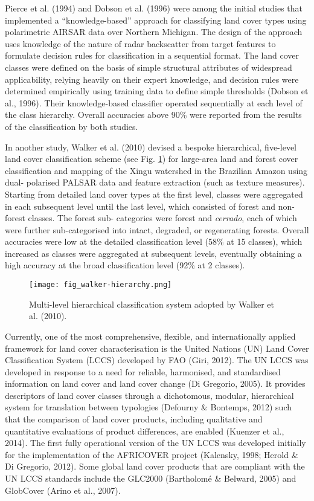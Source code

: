 Pierce et al. (1994) and Dobson et al. (1996) were among the initial studies that implemented a \enquote{knowledge-based} approach for classifying land cover types using polarimetric AIRSAR data over Northern Michigan. The design of the approach uses knowledge of the nature of radar backscatter from target features to formulate decision rules for classification in a sequential format. The land cover classes were defined on the basis of simple structural attributes of widespread applicability, relying heavily on their expert knowledge, and decision rules were determined empirically using training data to define simple thresholds (Dobson et al., 1996). Their knowledge-based classifier operated sequentially at each level of the class hierarchy. Overall accuracies above 90\% were reported from the results of the classification by both studies.

In another study, Walker et al. (2010) devised a bespoke hierarchical, five-level land cover classification scheme (see Fig. \ref{fig: litrev-fig2.1}) for large-area land and forest cover classification and mapping of the Xingu watershed in the Brazilian Amazon using dual- polarised PALSAR data and feature extraction (such as texture measures). Starting from detailed land cover types at the first level, classes were aggregated in each subsequent level until the last level, which consisted of forest and non-forest classes. The forest sub- categories were forest and \textit{cerrado}, each of which were further sub-categorised into intact, degraded, or regenerating forests. Overall accuracies were low at the detailed classification level (58\% at 15 classes), which increased as classes were aggregated at subsequent levels, eventually obtaining a high accuracy at the broad classification level (92\% at 2 classes).

\begin{figure}
	\centering
	\texttt{[image: fig\_walker-hierarchy.png]}
	\caption[Multi-level hierarchical classification system.]{Multi-level hierarchical classification system adopted by Walker et al. (2010).}
	\label{fig: litrev-fig2.1}
\end{figure}

Currently, one of the most comprehensive, flexible, and internationally applied framework for land cover characterisation is the United Nations (UN) Land Cover Classification System (LCCS) developed by FAO (Giri, 2012). The UN LCCS was developed in response to a need for reliable, harmonised, and standardised information on land cover and land cover change (Di Gregorio, 2005). It provides descriptors of land cover classes through a dichotomous, modular, hierarchical system for translation between typologies (Defourny \& Bontemps, 2012) such that the comparison of land cover products, including qualitative and quantitative evaluations of product differences, are enabled (Kuenzer et al., 2014). The first fully operational version of the UN LCCS was developed initially for the implementation of the AFRICOVER project (Kalensky, 1998; Herold \& Di Gregorio, 2012). Some global land cover products that are compliant with the UN LCCS standards include the GLC2000 (Bartholomé \& Belward, 2005) and GlobCover (Arino et al., 2007).

